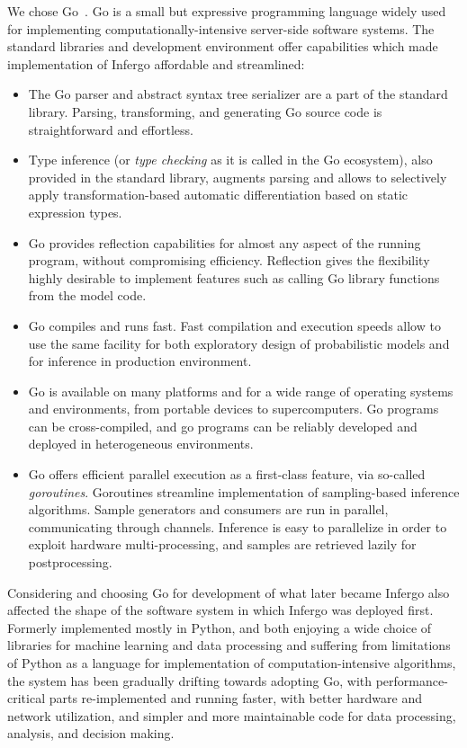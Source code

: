 \documentclass[sigplan,review,10pt,anonymous]{acmart}
\begin{document}
\begin{sloppypar}
We chose Go~\cite{Golang}. Go is a small but expressive
programming language widely used for implementing
computationally-intensive server-side software systems. 
The standard libraries and development environment offer
capabilities which made implementation of Infergo affordable
and streamlined:

\begin{itemize}
	\item The Go parser and abstract syntax tree serializer are
		a part of the standard library. Parsing, transforming,
		and generating Go source code is straightforward and
		effortless.
	\item Type inference (or \textit{type checking} as it is
		called in the Go ecosystem), also provided in the
		standard library, augments parsing and allows to
		selectively apply transformation-based automatic
		differentiation  based on static expression types. 
	\item Go provides reflection capabilities for almost any aspect
		of the running program, without compromising efficiency.
		Reflection gives the flexibility highly desirable to
		implement features such as calling Go library
		functions from the model code.
	\item Go compiles and runs fast. Fast compilation and
		execution speeds allow to use the same facility for both
		exploratory design of probabilistic models and for
		inference in production environment.
	\item Go is available on many platforms and for a wide range
		of operating systems and environments, from portable
		devices to supercomputers. Go programs can be
		cross-compiled, and go programs can be reliably
		developed and deployed in heterogeneous environments.
	\item Go offers efficient parallel execution as a
		first-class feature, via so-called \textit{goroutines}.
		Goroutines streamline implementation of sampling-based
		inference algorithms. Sample generators and consumers
		are run in parallel, communicating through channels. 
		Inference is easy to parallelize in order to exploit
		hardware multi-processing, and samples are retrieved
		lazily for postprocessing. 
\end{itemize}

Considering and choosing Go for development of what later became
Infergo also affected the shape of the software system in which
Infergo was deployed first. Formerly implemented mostly in
Python, and both enjoying a wide choice of libraries for machine
learning and data processing and suffering from limitations of
Python as a language for implementation of computation-intensive
algorithms, the system has been gradually drifting towards
adopting Go, with performance-critical parts re-implemented and
running faster, with better hardware and network utilization,
and simpler and more maintainable code for data processing,
analysis, and decision making.


\end{sloppypar}
\end{document}
